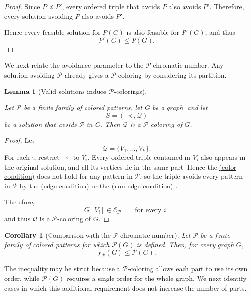 \documentclass[12pt]{article}
\theoremstyle{plain}
\newtheorem{lemma}[theorem]{Lemma}
\newtheorem{corollary}[theorem]{Corollary}
\theoremstyle{definition}
\theoremstyle{remark}
\theoremstyle{definition}
\newcommand{\edgecondition}{%
  \hyperref[def:avoid:cond:edge]{(edge condition)}\xspace
}
\newcommand{\nonedgecondition}{%
  \hyperref[def:avoid:cond:nonedge]{(non-edge condition)}\xspace
}
\newcommand{\colorcondition}{%
  \hyperref[def:avoid:cond:color]{(color condition)}\xspace
}
\begin{document}
\begin{proof}
Since \(P\preceq P'\), every ordered triple that avoids \(P\) also
avoids \(P'\). Therefore, every solution avoiding \(P\) also avoids
\(P'\).

Hence every feasible solution for \(P(G)\) is also feasible for
\(P'(G)\), and thus
\[
P'(G)\le P(G).
\]
\end{proof}



We next relate the avoidance parameter to the
\(\mathcal P\)-chromatic number. Any solution avoiding \(\mathcal P\)
already gives a \(\mathcal P\)-coloring by considering its partition.


\begin{lemma}[Valid solutions induce \(\mathcal P\)-colorings]
\label{lem:solution-induces-P-coloring}

Let \(\mathcal P\) be a finite family of colored patterns, let \(G\) be a
graph, and let
\[
S=(\prec,\mathcal Q)
\]
be a solution that avoids \(\mathcal P\) in \(G\). Then \(\mathcal Q\)
is a \(\mathcal P\)-coloring of \(G\).
\end{lemma}

\begin{proof}
Let
\[
\mathcal Q=\{V_1,\dots,V_k\}.
\]
For each \(i\), restrict \(\prec\) to \(V_i\). Every ordered triple
contained in \(V_i\) also appears in the original solution, and all its
vertices lie in the same part. Hence the \colorcondition{} does not hold
for any pattern in \(\mathcal P\), so the triple avoids every pattern in
\(\mathcal P\) by the \edgecondition{} or the \nonedgecondition{}.

Therefore,
\[
G[V_i]\in\mathcal C_{\mathcal P}
\qquad
\text{for every }i,
\]
and thus \(\mathcal Q\) is a \(\mathcal P\)-coloring of \(G\).
\end{proof}




\begin{corollary}[Comparison with the \(\mathcal P\)-chromatic number]
\label{cor:chiP-parameter}
Let \(\mathcal P\) be a finite family of colored patterns for which
\(\mathcal P(G)\) is defined. Then, for every graph \(G\),
\[
\chi_{\mathcal P}(G)\le \mathcal P(G).
\]
\end{corollary}



The inequality may be strict because a \(\mathcal P\)-coloring allows each
part to use its own order, while \(\mathcal P(G)\) requires a single order
for the whole graph. We next identify cases in which this additional
requirement does not increase the number of parts.
\end{document}
